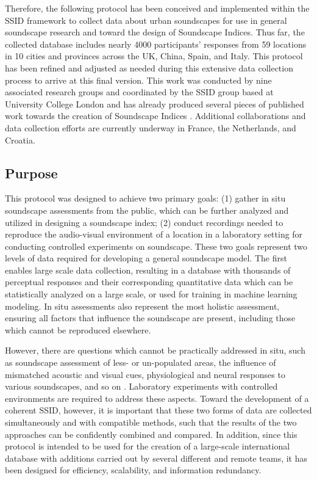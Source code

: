    Therefore, the following protocol has been conceived and implemented within the SSID framework to collect data about urban soundscapes for use in general soundscape research and toward the design of Soundscape Indices. Thus far, the collected database includes nearly 4000 participants' responses from 59 locations in 10 cities and provinces across the UK, China, Spain, and Italy. This protocol has been refined and adjusted as needed during this extensive data collection process to arrive at this final version. This work was conducted by nine associated research groups and coordinated by the SSID group based at University College London and has already produced several pieces of published work towards the creation of Soundscape Indices \citep{Aletta2018Towards,Aletta2019Exploring,Mitchell2019spectral,Mitchell2019Making,Aletta2019Associations,Lionello2019dimension,Aletta2019Exploring,Oberman2018Towards}. Additional collaborations and data collection efforts are currently underway in France, the Netherlands, and Croatia.

 \subsection{Purpose}
   This protocol was designed to achieve two primary goals: (1) gather in situ soundscape assessments from the public, which can be further analyzed and utilized in designing a soundscape index; (2) conduct recordings needed to reproduce the audio-visual environment of a location in a laboratory setting for conducting controlled experiments on soundscape. These two goals represent two levels of data required for developing a general soundscape model. The first enables large scale data collection, resulting in a database with thousands of perceptual responses and their corresponding quantitative data which can be statistically analyzed on a large scale, or used for training in machine learning modeling. In situ assessments also represent the most holistic assessment, ensuring all factors that influence the soundscape are present, including those which cannot be reproduced elsewhere.

   However, there are questions which cannot be practically addressed in situ, such as soundscape assessment of less- or un-populated areas, the influence of mismatched acoustic and visual cues, physiological and neural responses to various soundscapes, and so on \citep{Kogan2017comprehensive}. Laboratory experiments with controlled environments are required to address these aspects. Toward the development of a coherent SSID, however, it is important that these two forms of data are collected simultaneously and with compatible methods, such that the results of the two approaches can be confidently combined and compared. In addition, since this protocol is intended to be used for the creation of a large-scale international database with additions carried out by several different and remote teams, it has been designed for efficiency, scalability, and information redundancy.

